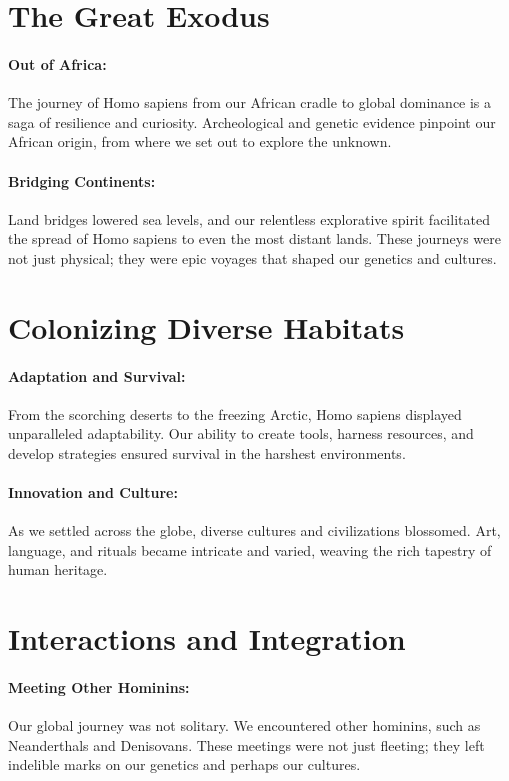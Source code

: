 \documentclass[a4paper,12pt]{book}
\begin{document}
\section*{The Great Exodus}

\paragraph{Out of Africa:}
The journey of Homo sapiens from our African cradle to global dominance is a saga of resilience and curiosity. Archeological and genetic evidence pinpoint our African origin, from where we set out to explore the unknown.

\paragraph{Bridging Continents:}
Land bridges lowered sea levels, and our relentless explorative spirit facilitated the spread of Homo sapiens to even the most distant lands. These journeys were not just physical; they were epic voyages that shaped our genetics and cultures.

\section*{Colonizing Diverse Habitats}

\paragraph{Adaptation and Survival:}
From the scorching deserts to the freezing Arctic, Homo sapiens displayed unparalleled adaptability. Our ability to create tools, harness resources, and develop strategies ensured survival in the harshest environments.

\paragraph{Innovation and Culture:}
As we settled across the globe, diverse cultures and civilizations blossomed. Art, language, and rituals became intricate and varied, weaving the rich tapestry of human heritage.

\section*{Interactions and Integration}

\paragraph{Meeting Other Hominins:}
Our global journey was not solitary. We encountered other hominins, such as Neanderthals and Denisovans. These meetings were not just fleeting; they left indelible marks on our genetics and perhaps our cultures.
\end{document}
